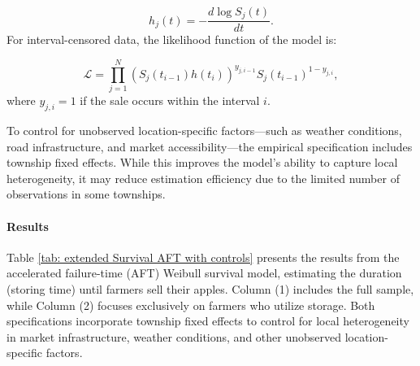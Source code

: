 \documentclass[12pt]{article}
\begin{document}
\begin{equation}
    h_j(t) = -\frac{d \log S_j(t)}{dt}.
\end{equation}
For interval-censored data, the likelihood function of the model is:  

\begin{equation}
    \mathcal{L} = \prod_{j=1}^N \left(S_j(t_{i-1}) h(t_i)\right)^{y_{j,i-1}} S_j(t_{i-1})^{1-y_{j,i}},
\end{equation}
where $y_{j,i} = 1$ if the sale occurs within the interval $i$.  

To control for unobserved location-specific factors—such as weather conditions, road infrastructure, and market accessibility—the empirical specification includes township fixed effects. While this improves the model’s ability to capture local heterogeneity, it may reduce estimation efficiency due to the limited number of observations in some townships.



\paragraph{Results}
Table \ref{tab: extended Survival AFT with controls} presents the results from the accelerated failure-time (AFT) Weibull survival model, estimating the duration (storing time) until farmers sell their apples. Column (1) includes the full sample, while Column (2) focuses exclusively on farmers who utilize storage. Both specifications incorporate township fixed effects to control for local heterogeneity in market infrastructure, weather conditions, and other unobserved location-specific factors.  
\end{document}
